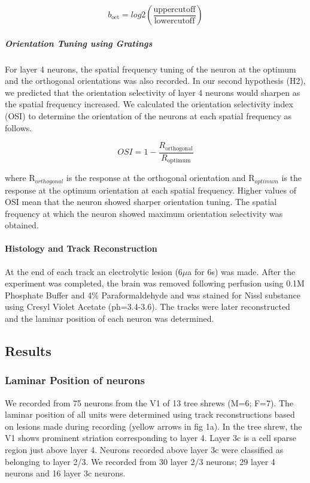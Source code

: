 \[b_{\text{oct}} = log2(\frac{\text{uppercutoff}}{\text{lowercutoff}})\]


\subparagraph{Orientation Tuning using Gratings}

For layer 4 neurons, the spatial frequency tuning of the neuron at the
optimum and the orthogonal orientations was also recorded. In our second
hypothesis (H2), we predicted that the orientation selectivity of layer
4 neurons would sharpen as the spatial frequency increased. We
calculated the orientation selectivity index (OSI) to determine the
orientation of the neurons at each spatial frequency as follows.

\[OSI = 1 - \frac{R_{\text{orthogonal}}}{R_{\text{optimum}}}\]

where R$_{orthogonal}$ is the response at the orthogonal
orientation and R$_{optimum}$ is the response at the optimum
orientation at each spatial frequency. Higher values of OSI mean that
the neuron showed sharper orientation tuning. The spatial frequency at
which the neuron showed maximum orientation selectivity was obtained.


\paragraph{Histology and Track Reconstruction}

At the end of each track an electrolytic lesion (6\(\mu\)a for 6s) was
made. After the experiment was completed, the brain was removed
following perfusion using 0.1M Phosphate Buffer and 4\% Paraformaldehyde
and was stained for Nissl substance using Cresyl Violet Acetate
(ph=3.4-3.6). The tracks were later reconstructed and the laminar
position of each neuron was determined.


\subsection{Results}


\subsubsection{Laminar Position of neurons}

We recorded from 75 neurons from the V1 of 13 tree shrews (M=6; F=7).
The laminar position of all units were determined using track
reconstructions based on lesions made during recording (yellow arrows in
fig 1a). In the tree shrew, the V1 shows prominent striation
corresponding to layer 4. Layer 3c is a cell sparse region just above
layer 4. Neurons recorded above layer 3c were classified as belonging to
layer 2/3. We recorded from 30 layer 2/3 neurons; 29 layer 4 neurons and
16 layer 3c neurons.

